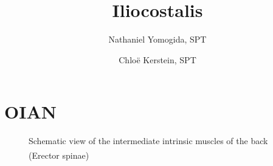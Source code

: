 \documentclass[
  letterpaper,
  DIV=11,
  numbers=noendperiod]{scrartcl}
\title{Iliocostalis}
\author{Nathaniel Yomogida, SPT \and Chloë Kerstein, SPT}
\date{}
\renewcommand*\contentsname{Table of contents}
\newcommand\contentsname{Table of contents}
\begin{document}
\maketitle

\renewcommand*\contentsname{Table of contents}
{
\hypersetup{linkcolor=}
\setcounter{tocdepth}{3}
\tableofcontents
}
\section{OIAN}\label{oian}

\begin{figure}


\caption{\label{fig-schematicintermediatebackmm39gilroyAtlasAnatomy2020}Schematic
view of the intermediate intrinsic muscles of the back (Erector
spinae)\textsuperscript{}}

\end{figure}%
\end{document}
